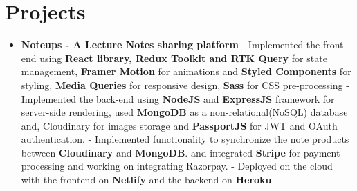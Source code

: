 \documentclass{article}
\begin{document}
\section*{Projects}
\begin{itemize}

    \item{\textbf{\large{Noteups - A Lecture Notes sharing platform} }}
          \newline
          \textmd{- Implemented the front-end using \textbf{React library, Redux Toolkit and RTK Query} for state management, \textbf{Framer Motion} for animations and \textbf{Styled Components} for styling, \textbf{Media Queries} for responsive design, \textbf{Sass} for CSS pre-processing}
          \newline
          \textmd{- Implemented the back-end using \textbf{NodeJS} and \textbf{ExpressJS} framework for server-side rendering, used \textbf{MongoDB} as a non-relational(NoSQL) database and, Cloudinary for images storage and \textbf{PassportJS} for JWT and OAuth authentication.}
          \newline
          \textmd{- Implemented functionality to synchronize the note products between \textbf{Cloudinary} and \textbf{MongoDB}. and integrated \textbf{Stripe} for payment processing and working on integrating Razorpay.}
          \newline
          \textmd{- Deployed on the cloud with the frontend on \textbf{Netlify} and the backend on \textbf{Heroku}.}


\end{itemize}
\end{document}
